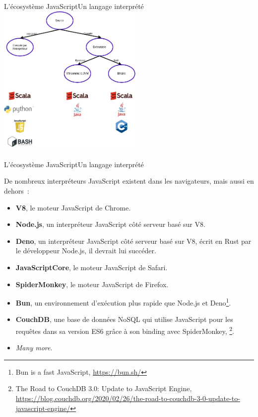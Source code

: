 \documentclass{beamer}
\begin{document}
    \begin{frame}{L'écosystème JavaScript}{Un langage interprété}
        \centering
        \includegraphics[width=7cm]{image/code-inter-vs-compiled}
    \end{frame}

    \begin{frame}{L'écosystème JavaScript}{Un langage interprété}
        \begin{small}
            De nombreux interpréteurs JavaScript existent dans les navigateurs, mais aussi en dehors~:
            \begin{itemize}
                \item \textbf{V8}, le moteur JavaScript de Chrome.
                \item \textbf{Node.js}, un interpréteur JavaScript côté serveur basé sur V8.
                \item \textbf{Deno}, un interpréteur JavaScript côté serveur basé sur V8, écrit en Rust par le développeur Node.js, il devrait lui succéder.
                \item \textbf{JavaScriptCore}, le moteur JavaScript de Safari.
                \item \textbf{SpiderMonkey}, le moteur JavaScript de Firefox.
                \item \textbf{Bun}, un environnement d'exécution plus rapide que Node.js et Deno\footnote{\label{bun}Bun is a fast JavaScript, \url{https://bun.sh/}}.
                \item \textbf{CouchDB}, une base de données NoSQL qui utilise JavaScript pour les requêtes dans sa version ES6 grâce à son binding avec SpiderMonkey, \footnote{The Road to CouchDB 3.0: Update to JavaScript Engine, \url{https://blog.couchdb.org/2020/02/26/the-road-to-couchdb-3-0-update-to-javascript-engine/}}.
                \item \textit{Many more}.
            \end{itemize}
        \end{small}
    \end{frame}
\end{document}
